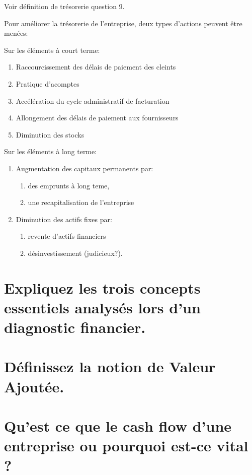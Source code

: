 \documentclass{article}
\begin{document}
Voir définition de trésorerie question 9.

Pour améliorer la trésorerie de l'entreprise, deux types d'actions peuvent être menées:

Sur les éléments à court terme:
\begin{enumerate}
	\item Raccourcissement des délais de paiement des cleints
	\item Pratique d'acomptes
	\item Accélération du cycle administratif de facturation
	\item Allongement des délais de paiement aux fournisseurs
	\item Diminution des stocks
\end{enumerate}
Sur les éléments à long terme:
\begin{enumerate}
	\item Augmentation des capitaux permanents par:
	\begin{enumerate}
		\item des emprunts à long teme,
		\item une recapitalisation de l'entreprise
	\end{enumerate}
	\item Diminution des actifs fixes par:
	\begin{enumerate}
		\item revente d'actifs financiers
		\item désinvestissement (judicieux?).
	\end{enumerate}
\end{enumerate}


\section{Expliquez les trois concepts essentiels analysés lors d’un diagnostic financier.}
\section{Définissez la notion de Valeur Ajoutée.}
\section{Qu’est ce que le cash flow d’une entreprise ou pourquoi est-ce vital ?}

\printbibliography
\end{document}
